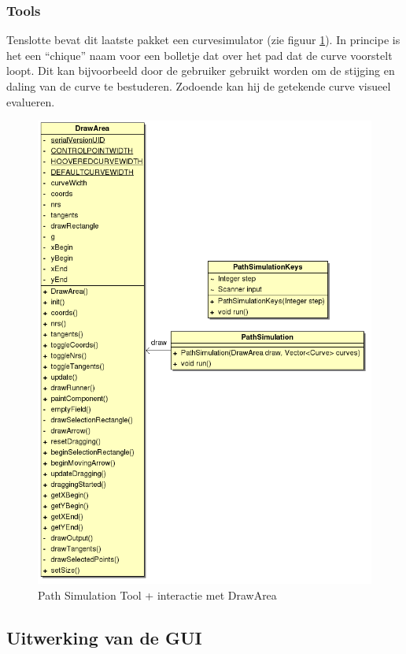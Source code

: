\documentclass[a4paper,11pt,oneside, titlepage]{article}
\begin{document}
\subsubsection{Tools}
Tenslotte bevat dit laatste pakket een curvesimulator (zie figuur \ref{iTools}). In principe is het een ``chique'' naam voor een bolletje
dat over het pad dat de curve voorstelt loopt. Dit kan bijvoorbeeld door de gebruiker gebruikt worden om de stijging en daling
van de curve te bestuderen. Zodoende kan hij de getekende curve visueel evalueren.
\begin{figure}[htbp]
\centering
\includegraphics[scale=0.5]{./UML2/Path.png}
\caption{Path Simulation Tool + interactie met DrawArea}\label{iTools}
\end{figure}\newpage
\subsection{Uitwerking van de GUI}
\end{document}
